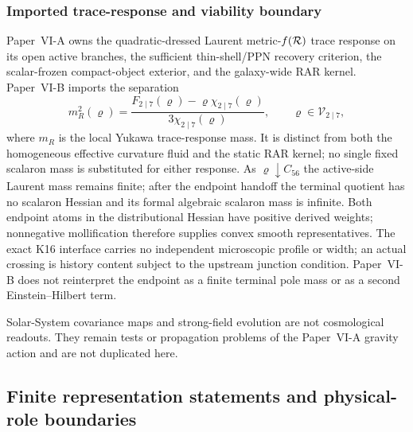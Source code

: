 \documentclass[12pt,a4paper]{article}
\begin{document}
\subsubsection{Imported trace-response and viability boundary}
\label{p9:sec:imported-trace-viability-boundary}
Paper~VI-A owns the quadratic-dressed Laurent metric-\(f(\mathcal R)\) trace response
on its open active branches, the sufficient
thin-shell/PPN recovery criterion, the scalar-frozen compact-object exterior,
and the galaxy-wide RAR kernel.  Paper~VI-B imports the separation
\begin{equation}
\label{p9:eq:local-trace-mass-clean}
 m_R^2(\varrho)
 =\frac{F_{2\mid7}(\varrho)-\varrho\chi_{2\mid7}(\varrho)}
 {3\chi_{2\mid7}(\varrho)},
 \qquad
 \varrho\in\mathscr V_{2\mid7},
\end{equation}
where $m_R$ is the local Yukawa trace-response mass.  It is distinct from both
the homogeneous effective curvature fluid and the static RAR kernel; no
single fixed scalaron mass is substituted for either response.  As
\(\varrho\downarrow C_{56}\) the
active-side Laurent mass remains finite; after the
endpoint handoff the terminal quotient has no scalaron Hessian and its formal
algebraic scalaron mass is infinite.  Both endpoint atoms in the
distributional Hessian have positive derived weights; nonnegative
mollification therefore supplies convex smooth representatives.
The exact K16 interface carries no independent microscopic profile or width;
an actual crossing is history content subject to the upstream junction
condition.  Paper~VI-B does not reinterpret the endpoint as a finite terminal
pole mass or as a second Einstein--Hilbert term.

Solar-System covariance maps and strong-field evolution are not cosmological
readouts.  They remain tests or propagation problems of the Paper~VI-A gravity
action and are not duplicated here.

\label{p9:part:reduced-kernels-growth-transfer}

\subsection{Finite representation statements and physical-role boundaries}
\label{p9:sec:h0}
\end{document}

